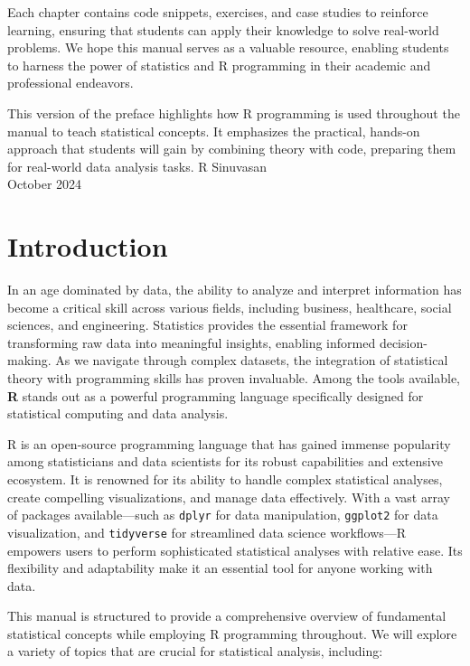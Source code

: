 \documentclass[12pt]{book}
\begin{document}
Each chapter contains code snippets, exercises, and case studies to reinforce learning, ensuring that students can apply their knowledge to solve real-world problems. We hope this manual serves as a valuable resource, enabling students to harness the power of statistics and R programming in their academic and professional endeavors.

This version of the preface highlights how R programming is used throughout the manual to teach statistical concepts. It emphasizes the practical, hands-on approach that students will gain by combining theory with code, preparing them for real-world data analysis tasks.
\vspace{0.5in}
R Sinuvasan \\
October 2024

\newpage

\tableofcontents
\newpage

\chapter{Introduction}

In an age dominated by data, the ability to analyze and interpret information has become a critical skill across various fields, including business, healthcare, social sciences, and engineering. Statistics provides the essential framework for transforming raw data into meaningful insights, enabling informed decision-making. As we navigate through complex datasets, the integration of statistical theory with programming skills has proven invaluable. Among the tools available, \textbf{R} stands out as a powerful programming language specifically designed for statistical computing and data analysis.

R is an open-source programming language that has gained immense popularity among statisticians and data scientists for its robust capabilities and extensive ecosystem. It is renowned for its ability to handle complex statistical analyses, create compelling visualizations, and manage data effectively. With a vast array of packages available—such as \texttt{dplyr} for data manipulation, \texttt{ggplot2} for data visualization, and \texttt{tidyverse} for streamlined data science workflows—R empowers users to perform sophisticated statistical analyses with relative ease. Its flexibility and adaptability make it an essential tool for anyone working with data.

This manual is structured to provide a comprehensive overview of fundamental statistical concepts while employing R programming throughout. We will explore a variety of topics that are crucial for statistical analysis, including:
\end{document}
